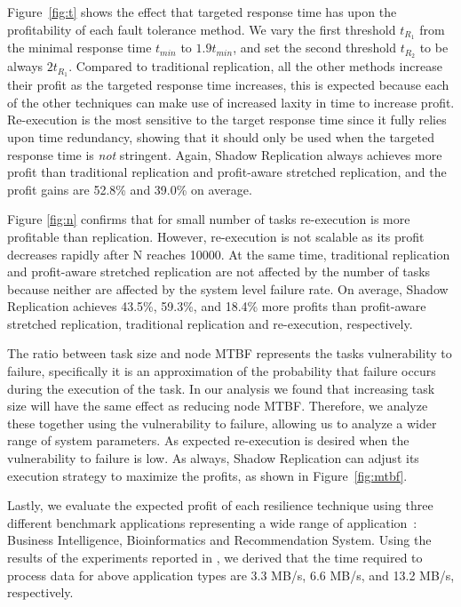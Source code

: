 Figure~\ref{fig:t} shows the effect that targeted response time has upon
the profitability of each fault tolerance method. We vary the first threshold $t_{R_1}$ from the minimal response
time $t_{min}$ to $1.9t_{min}$, and set the second threshold $t_{R_2}$
to be always $2t_{R_1}$. Compared to traditional replication, all the other methods increase their profit as the targeted
response time increases, this is expected because each of the other
techniques can make use of increased laxity in time to increase
profit. Re-execution is the most sensitive to the target response
time since it fully relies upon time redundancy, showing that it should only be used when the targeted response time is \emph{not} stringent. 
Again, Shadow Replication always achieves more profit than traditional
replication and profit-aware stretched replication, and the profit
gains are 52.8\% and 39.0\% on average. 

Figure \ref{fig:n} confirms that for small number of tasks
re-execution is more profitable than replication. However, re-execution is not scalable
as its profit decreases rapidly after N reaches 10000. At the same time, traditional
replication and profit-aware stretched replication are not
affected by the number of tasks because neither are affected by the
system level failure rate. On average, Shadow Replication achieves 43.5\%, 59.3\%, and 18.4\%
more profits than profit-aware stretched replication, traditional replication and re-execution, respectively. 

The ratio between task size and node MTBF represents the tasks
vulnerability to failure, specifically it is an approximation of the
probability that failure occurs during the execution of the task. In our
analysis we found that increasing task size will have the same effect
as reducing node MTBF. Therefore, we analyze these together using the
vulnerability to failure, allowing us to analyze a wider range of
system parameters. As expected
re-execution is desired when the vulnerability to failure is
low. As always, Shadow Replication can adjust its execution strategy to maximize the profits, as shown in Figure~\ref{fig:mtbf}.

Lastly, we evaluate
the expected profit of each resilience technique using three different
benchmark applications representing a wide range of
application~\cite{mrbs}: Business Intelligence, Bioinformatics and
Recommendation System. 
Using the results of the experiments reported in \cite{mrbs}, we
derived that the time required to process data for above application types are 3.3 MB/s, 6.6 MB/s, and 13.2 MB/s, respectively. 

